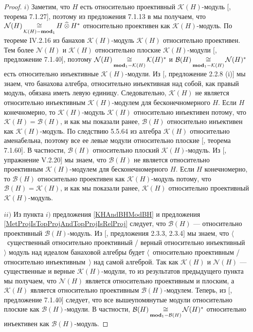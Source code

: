\begin{proof} $i)$ Заметим, что $H$ есть относительно проективный $\mathcal{K}(H)$-модуль [\cite{HelBanLocConvAlg}, теорема 7.1.27], поэтому из предложения 7.1.13 в \cite{HelBanLocConvAlg} мы получаем, что $\mathcal{N}(H)\mathop{\mathbin{\cong}}\limits_{\mathcal{K}(H)-\mathbf{mod}_1}H\mathbin{\widehat{\otimes}} H^*$ относительно проективен как $\mathcal{K}(H)$-модуль. По теореме IV.2.16 из \cite{HelHomolBanTopAlg} банахов $\mathcal{K}(H)$-модуль $\mathcal{K}(H)$ относительно проективен. Тем более $\mathcal{N}(H)$ и $\mathcal{K}(H)$ относительно плоские $\mathcal{K}(H)$-модули [\cite{HelBanLocConvAlg}, предложение 7.1.40], поэтому $\mathcal{N}(H)\mathop{\mathbin{\cong}}\limits_{\mathbf{mod}_1-\mathcal{K}(H)}\mathcal{K}(H)^*$ и $\mathcal{B}(H)\mathop{\mathbin{\cong}}\limits_{\mathbf{mod}_1-\mathcal{K}(H)}\mathcal{N}(H)^*$ есть относительно инъективные $\mathcal{K}(H)$-модули. Из [\cite{RamsHomPropSemgroupAlg}, предложение 2.2.8  (i)] мы знаем, что банахова алгебра, относительно инъективная над собой, как правый модуль, обязана иметь левую единицу. Следовательно, $\mathcal{K}(H)$ не является относительно инъективным $\mathcal{K}(H)$-модулем для бесконечномерного $H$. Если $H$ конечномерно, то $\mathcal{K}(H)$-модуль $\mathcal{K}(H)$ относительно инъективен потому, что $\mathcal{K}(H)=\mathcal{B}(H)$, и как мы показали ранее, $\mathcal{B}(H)$ относительно инъективен как $\mathcal{K}(H)$-модуль. По следствию 5.5.64 из \cite{DalBanAlgAutCont} алгебра $\mathcal{K}(H)$ относительно аменабельна, поэтому все ее левые модули относительно плоские [\cite{HelBanLocConvAlg}, теорема 7.1.60]. В частности, $\mathcal{B}(H)$ относительно плоский $\mathcal{K}(H)$-модуль. Из [\cite{HelHomolBanTopAlg}, упражнение V.2.20] мы знаем, что $\mathcal{B}(H)$ не является относительно проективным $\mathcal{K}(H)$-модулем для бесконечномерного $H$. Если $H$ конечномерно, то $\mathcal{B}(H)$ относительно проективен как $\mathcal{K}(H)$-модуль потому, что $\mathcal{B}(H)=\mathcal{K}(H)$, и как мы показали ранее, $\mathcal{K}(H)$ относительно проективный $\mathcal{K}(H)$-модуль.

$ii)$ Из пункта $i)$ предложения \ref{KHAndBHModBH} и предложения \ref{MetProjIsTopProjAndTopProjIsRelProj} следует, что $\mathcal{B}(H)$ --- относительно проективный $\mathcal{B}(H)$-модуль. Из [\cite{RamsHomPropSemgroupAlg}, предложения 2.3.3, 2.3.4] мы знаем, что $\langle$~существенный относительно проективный / верный относительно инъективный~$\rangle$ модуль над идеалом банаховой алгебры будет $\langle$~относительно проективным / относительно инъективным~$\rangle$ над самой алгеброй. Так как $\mathcal{K}(H)$ и $\mathcal{N}(H)$ --- существенные и верные $\mathcal{K}(H)$-модули, то из результатов предыдущего пункта мы получаем, что $\mathcal{N}(H)$ является относительно проективным и плоским, а $\mathcal{K}(H)$ является относительно проективным  $\mathcal{B}(H)$-модулем. Теперь, из [\cite{HelBanLocConvAlg}, предложение 7.1.40] следует, что все вышеупомянутые модули относительно плоские как $\mathcal{B}(H)$-модули. В частности, $\mathcal{B}(H)\mathop{\mathbin{\cong}}\limits_{\mathbf{mod}_1-\mathcal{B}(H)}\mathcal{N}(H)^*$ относительно инъективен как $\mathcal{B}(H)$-модуль.
\end{proof}


